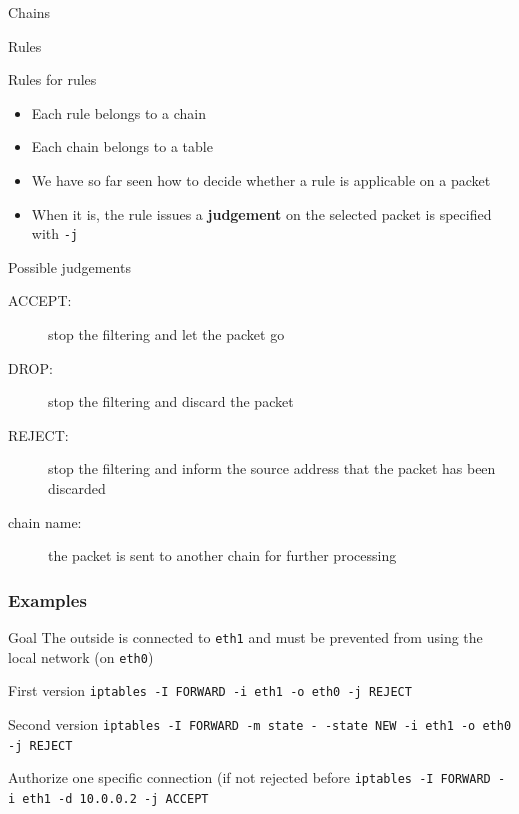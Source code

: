 \begin{reveals}
\begin{frame}[c]{Chains}
  
\end{frame}


\begin{frame}[c]{Rules}
  
  \begin{block}{Rules for rules}
    \begin{itemize}
    \item Each rule belongs to a chain
    \item Each chain belongs to a table
    \item We have so far seen how to decide whether a rule is
      applicable on a packet
    \item When it is, the rule issues a \textbf{judgement} on the
      selected packet is specified with \texttt{-j}
    \end{itemize}
  \end{block}

  \vfill
  \begin{block}{Possible judgements}
    \begin{description}
    \item[ACCEPT:] stop the filtering and let the packet go
    \item[DROP:] stop the filtering and discard the packet
    \item[REJECT:] stop the filtering and inform the source address
      that the packet has been discarded
    \item[chain name:] the packet is sent to another chain for further processing
    \end{description}
  \end{block}
\end{frame}

\begin{frame}
  \frametitle{Examples}
  \vfill
  \begin{block}{Goal}
    The outside is connected to \texttt{eth1} and must be prevented
    from using the local network (on \texttt{eth0})
  \end{block}
  \pause\vfill 
  \begin{block}{First version}
    \small\tt iptables -I FORWARD -i eth1 -o eth0 -j REJECT
  \end{block}
   \pause\vfill 
 \begin{block}{Second version }
    \small\tt iptables -I FORWARD -m state -\,-state NEW -i eth1 -o eth0 -j REJECT
  \end{block}
   \pause\vfill 
 \begin{block}{Authorize one specific connection (if not rejected before}
   \small\tt iptables -I FORWARD -i eth1 -d 10.0.0.2 -j ACCEPT
  \end{block}
  \vfill
\end{frame}


\end{reveals}
